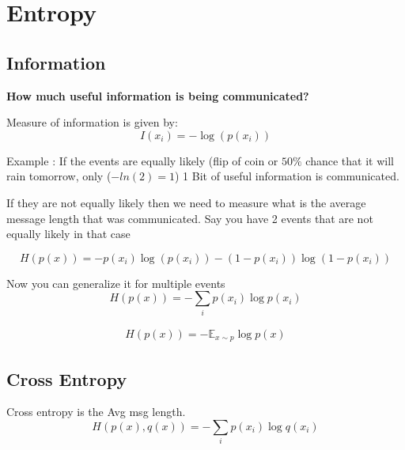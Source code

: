 \chapter{Entropy}

\section{Information}

\textbf{How much useful information is being communicated?}


Measure of information is given by:
\begin{equation}
I(x_i) = - \log(p(x_i))    
\end{equation}

\noindent Example : If the events are equally likely (flip of coin or $50\%$ chance that it will rain tomorrow, only ($-ln(2) = 1$) 1 Bit of useful information is communicated.

\noindent If they are not equally likely then we need to measure what is the average message length that was communicated. Say you have 2 events that are not equally likely in that case 

\begin{equation}
H(p(x)) = - p(x_i) \log(p(x_i)) - (1-p(x_i)) \log(1-p(x_i))
\end{equation}

Now you can generalize it for multiple events 
\begin{equation}
H(p(x)) = - \underset{i}{\sum} p(x_i) \log p(x_i)
\end{equation}

\begin{equation}
\begin{split}
    H(p(x)) = − \mathbb{E}_{x \sim p} \log p(x)
\end{split}
\end{equation}

\section{Cross Entropy}
Cross entropy is the Avg msg length. 
\begin{equation}
H(p(x),q(x)) = - \underset{i}{\sum} p(x_i) \log q(x_i)
\end{equation}

